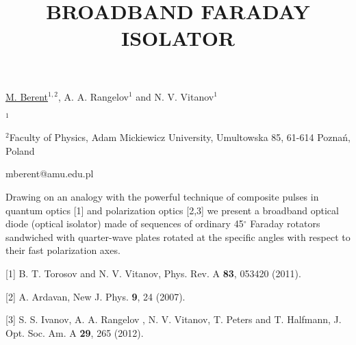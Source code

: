 \title{BROADBAND FARADAY ISOLATOR}

\underline{M. Berent}$^{1,2}$, A. A. Rangelov$^{1}$ and N. V. Vitanov$^{1}$  

{\normalsize{
\vspace{-4mm} $^{1}$\unisofia

\vspace{-4mm} $^{2}$Faculty of Physics, Adam Mickiewicz University, Umultowska 85, 61-614 Pozna\'n, Poland

\email mberent@amu.edu.pl}}

Drawing on an analogy with the powerful technique of composite pulses in quantum optics [1] and polarization optics [2,3] we present a broadband optical diode (optical isolator) made of sequences of ordinary 45$^\circ$ Faraday rotators sandwiched with quarter-wave plates rotated at the specific angles with respect to their fast polarization axes.

{\normalsize
[1] B. T. Torosov and N. V. Vitanov, Phys. Rev. A \textbf{83}, 053420 (2011).
\vsp

[2] A. Ardavan, New J. Phys. \textbf{9}, 24 (2007).
\vsp

[3] S. S. Ivanov, A. A. Rangelov , N. V. Vitanov, T. Peters and T. Halfmann, J. Opt. Soc. Am. A \textbf{29}, 265 (2012).
}

\vspace{\baselineskip} 